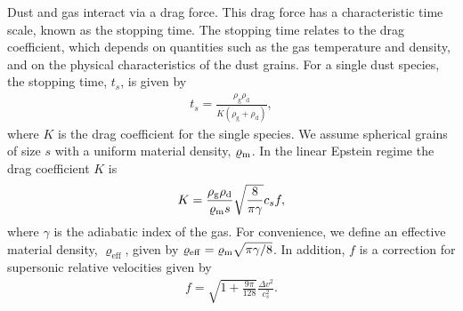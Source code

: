 \documentclass[fleqn,usenatbib]{mnras}
\newcommand{\g}{\mathrm{g}}
\newcommand{\dd}{\mathrm{d}}
\begin{document}
Dust and gas interact via a drag force. This drag force has a characteristic
time scale, known as the stopping time. The stopping time relates to the drag
coefficient, which depends on quantities such as the gas temperature and
density, and on the physical characteristics of the dust grains. For a single
dust species, the stopping time, \(t_s\), is given by
%
\begin{align}
   \label{eqn:single-stopping-time}
   t_s = \frac{\rho_{\g} \rho_{\dd}}{K (\rho_{\g} + \rho_{\dd})},
\end{align}
%
where \(K\) is the drag coefficient for the single species. We assume spherical
grains of size \(s\) with a uniform material density, \(\varrho_{\rm m}\). In
the linear Epstein regime \citep{Epstein1924PhRv...23..710E} the drag
coefficient \(K\) is
%
\begin{align}
   \label{eqn:single-drag-coefficient}
   K = \frac{\rho_{\g} \rho_{\dd}}{\varrho_{\rm m} s} \sqrt{\frac{8}{\pi\gamma}} c_s f,
\end{align}
%
where \(\gamma\) is the adiabatic index of the gas. For convenience, we define
an effective material density, \(\varrho_{\mathrm{eff}}\), given by
\(\varrho_{\mathrm{eff}} = \varrho_{\rm m} \sqrt{\pi\gamma/8}\). In addition,
\(f\) is a correction for supersonic relative velocities given by
\citep{Kwok1975ApJ...198..583K}
%
\begin{align}
   \label{eqn:supersonic}
   f = \sqrt{1 + \frac{9\pi}{128}} \frac{\Delta v^2}{c_s^2}.
\end{align}
%
\end{document}
